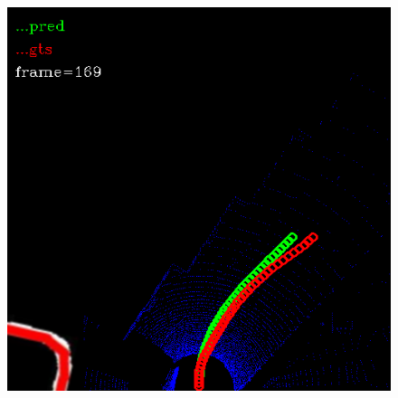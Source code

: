 \documentclass[letterpaper,10 pt,conference]{ieeeconf}  %
\begin{document}
\begin{figure}
{        \includegraphics[scale=0.25]{../imgs/set_map_stight.png} \label{set_1}
    }
\end{figure}
\end{document}
